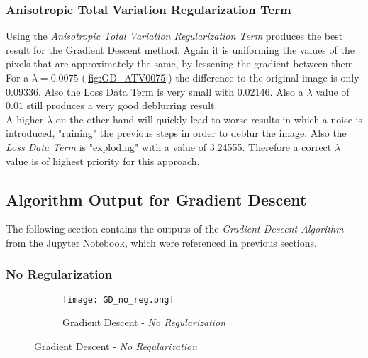 \documentclass{report}
\begin{document}
			\subsubsection{Anisotropic Total Variation Regularization Term}
			\startsubsection
				Using the \textit{Anisotropic Total Variation Regularization Term} produces the best result for the Gradient Descent method. Again it is uniforming the values of the pixels that are approximately the same, by lessening the gradient between them. For a $\lambda = 0.0075$ (\ref{fig:GD_ATV0075}) the difference to the original image is only 0.09336. Also the Loss Data Term is very small with 0.02146. Also a $\lambda$ value of $0.01$ still produces a very good deblurring result. \\
				A higher $\lambda$ on the other hand will quickly lead to worse results in which a noise is introduced, "ruining" the previous steps in order to deblur the image. Also the \textit{Loss Data Term} is "exploding" with a value of 3.24555. Therefore a correct $\lambda$ value is of highest priority for this approach.
			\closesection
		\closesection
		
		\newpage
		\subsection*{Algorithm Output for Gradient Descent}
		\startsubsection
			The following section contains the outputs of the \textit{Gradient Descent Algorithm} from the Jupyter Notebook, which were referenced in previous sections.
			\subsubsection*{No Regularization}
			\begin{figure}[H] \renewcommand\thesubfigure{GD.NR}
				\centering
				\begin{subfigure}[b]{0.7\textwidth}
					\texttt{[image: GD\_no\_reg.png]}
					\caption{Gradient Descent - \textit{No Regularization}}
					\label{fig:GD_NR}
				\end{subfigure}
			\end{figure}
\end{document}
